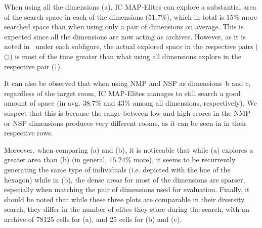 When using all the dimensions (a), IC MAP-Elites can explore a substantial area of the search space in each of the dimensions ($51.7$\%), which in total is 15\% more searched space than when using only a pair of dimensions on average. This is expected since all the dimensions are now acting as archives. However, as it is noted in~ under each subfigure, the actual explored space in the respective pairs ($\bigcirc$) is most of the time greater than what using all dimensions explore in the respective pair ($\dagger$).

It can also be observed that when using NMP and NSP as dimensions~b and c, regardless of the target room, IC MAP-Elites manages to still search a good amount of space (in avg. $38.7$\% and $43$\% among all dimensions, respectively). We suspect that this is because the range between low and high scores in the NMP or NSP dimensions produces very different rooms, as it can be seen in  in their respective rows. 


Moreover, when comparing (a) and (b), it is noticeable that while (a) explores a greater area than (b) (in general, $15.24$\% more), %
it seems to be recurrently generating the same type of individuals (i.e. depicted with the hue of the hexagon) while in (b), the dense areas for most of the dimensions are sparser, especially when matching the pair of dimensions used for evaluation. 
 Finally, it should be noted that while these three plots are comparable in their diversity search, they differ in the number of elites they store during the search, with an archive of 78125 cells for (a), and 25 cells for (b) and (c).


